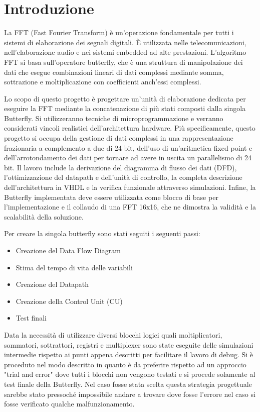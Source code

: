 \section{Introduzione}

\noindent La FFT (Fast Fourier Transform) è un'operazione fondamentale per tutti i sistemi di elaborazione dei segnali digitali.
È utilizzata nelle telecomunicazioni, nell'elaborazione audio e nei sistemi embedded ad alte prestazioni.
L'algoritmo FFT si basa sull'operatore butterfly, che è una struttura di manipolazione dei dati che esegue combinazioni lineari di dati complessi mediante somma, 
sottrazione e moltiplicazione con coefficienti anch'essi complessi.\par

Lo scopo di questo progetto è progettare un'unità di elaborazione dedicata per eseguire la FFT mediante la concatenazione di
più stati composti dalla singola Butterfly.
Si utilizzeranno tecniche di microprogrammazione e verranno considerati vincoli realistici dell'architettura hardware.
Più specificamente, questo progetto si occupa della gestione di dati complessi in una rappresentazione frazionaria a complemento
a due di 24 bit, dell'uso di un'aritmetica fixed point e dell'arrotondamento dei dati per tornare ad avere in uscita un parallelismo
di 24 bit.
Il lavoro include la derivazione del diagramma di flusso dei dati (DFD), l'ottimizzazione del datapath e dell'unità di controllo,
la completa descrizione dell'architettura in VHDL e la verifica funzionale attraverso simulazioni.
Infine, la Butterfly implementata deve essere utilizzata come blocco di base per l'implementazione e il collaudo di una FFT 16x16, 
che ne dimostra la validità e la scalabilità della soluzione.

\par\noindent Per creare la singola butterfly sono stati seguiti i seguenti passi:

\begin{itemize}
    \item Creazione del Data Flow Diagram
    \item Stima del tempo di vita delle variabili
    \item Creazione del Datapath
    \item Creazione della Control Unit (CU)
    \item Test finali
\end{itemize}

\noindent Data la necessità di utilizzare diversi blocchi logici quali moltiplicatori, sommatori, sottrattori, registri
e multiplexer sono state eseguite delle simulazioni intermedie rispetto ai punti appena descritti per facilitare il lavoro di debug.
Si è proceduto nel modo descritto in quanto è da preferire rispetto ad un approccio "trial and error" dove tutti i blocchi
non vengono testati e si procede solamente al test finale della Butterfly.
Nel caso fosse stata scelta questa strategia progettuale sarebbe stato pressoché impossibile andare a trovare dove fosse
l'errore nel caso si fosse verificato qualche malfunzionamento.\\

\pagebreak